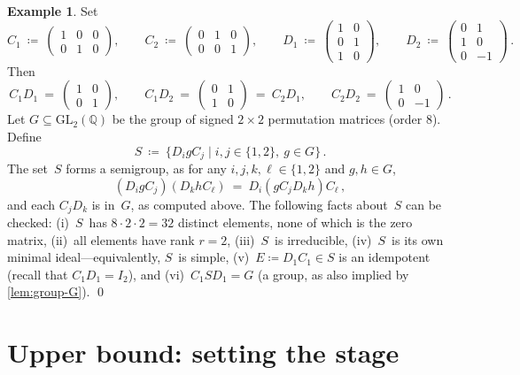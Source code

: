 \documentclass{lmcs}
\theoremstyle{definition}
\newtheorem{example}[thm]{Example}
\newcommand{\GL}{\mathrm{GL}}
\newcommand{\Q}{\mathbb{Q}}
\begin{document}
\begin{example} \label{ex:1}
Set
\[
  C_1 \ \coloneqq \ \begin{pmatrix}1&0&0\\0&1&0\end{pmatrix},\qquad
  C_2 \ \coloneqq \ \begin{pmatrix}0&1&0\\0&0&1\end{pmatrix},\qquad
  D_1 \ \coloneqq \ \begin{pmatrix}1&0\\0&1\\1&0\end{pmatrix}, \qquad
  D_2 \ \coloneqq \ \begin{pmatrix}0&1\\1&0\\0&-1\end{pmatrix}\,.
\]
Then
\[%
  C_1 D_1 \ = \ \begin{pmatrix}1&0\\0&1\end{pmatrix},\qquad
  C_1 D_2 \ = \ \begin{pmatrix}0&1\\1&0\end{pmatrix} \ = \  C_2 D_1,\qquad
  C_2 D_2 \ = \ \begin{pmatrix}1&0\\0&-1\end{pmatrix}\,.
\]
Let $G \subseteq \GL_2(\Q)$ be the group of signed $2 \times 2$ permutation matrices (order $8$).
Define 
\[
  S \ \coloneqq \ \{D_i g C_j \mid i,j \in \{1,2\},\ g \in G\}\,.
\]
The set~$S$ forms a semigroup, as for any $i,j,k,\ell \in \{1,2\}$ and $g,h \in G$,
\[
 (D_i g C_j) (D_k h C_\ell) \ = \ D_i (g C_j D_k h) C_\ell\,,
\]
and each $C_j D_k$ is in~$G$, as computed above.
The following facts about~$S$ can be checked:
(i)~$S$~has $8 \cdot 2 \cdot 2 = 32$ distinct elements, none of which is the zero matrix,
(ii)~all elements have rank $r=2$,
(iii)~$S$~is irreducible,
(iv)~$S$~is its own minimal ideal---equivalently, $S$~is simple,
(v)~$E \coloneqq D_1 C_1 \in S$ is an idempotent (recall that $C_1 D_1 = I_2$), and 
(vi)~$C_1 S D_1 = G$ (a group, as also implied by \cref{lem:group-G}).
\qed
\end{example}


\section{Upper bound: setting the stage}\label{sec:upper-one}
\end{document}
